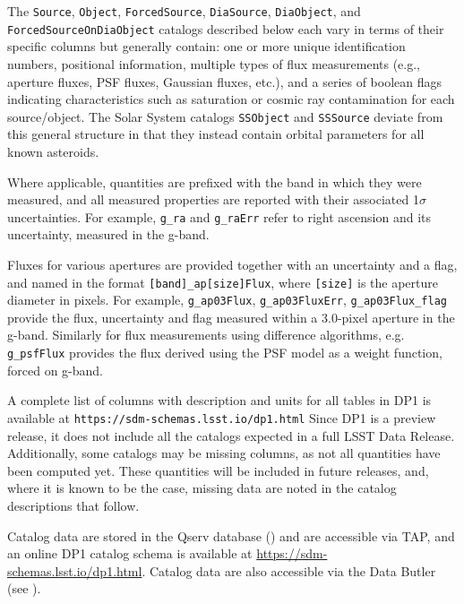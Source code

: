 The \texttt{Source}, \texttt{Object}, \texttt{ForcedSource}, \texttt{DiaSource}, \texttt{DiaObject}, and \texttt{ForcedSourceOnDiaObject} catalogs described below each vary in terms of their specific columns but generally contain: one or more unique identification numbers, positional information, multiple types of \gls{flux} measurements (e.g., aperture fluxes, \gls{PSF} fluxes, Gaussian fluxes, etc.), and a series of boolean flags indicating characteristics such as saturation or cosmic ray contamination for each source/object.
The Solar System catalogs \texttt{SSObject} and \texttt{SSSource} deviate from this general structure in that they instead contain orbital parameters for all known asteroids.

Where applicable, quantities are prefixed with the band in which they were measured, and all measured properties are reported with their associated 1$\sigma$ uncertainties.
For example, \texttt{g\_ra} and \texttt{g\_raErr} refer to right ascension and its uncertainty, measured in the g-band.

Fluxes for various apertures are provided together with an uncertainty and  a flag, and named in the format \texttt{[band]\_ap[size]Flux}, where \texttt{[size]} is the aperture diameter in pixels.
For example, \texttt{g\_ap03Flux}, \texttt{g\_ap03FluxErr}, \texttt{g\_ap03Flux\_flag} provide the flux, uncertainty and flag measured within a 3.0-pixel aperture in the g-band.
Similarly for flux measurements using difference algorithms, e.g. \texttt{g\_psfFlux} provides the flux derived using the PSF model as a weight function, forced on g-band.

A complete list of columns  with description and units for all tables in DP1 is available at \nolinkurl{https://sdm-schemas.lsst.io/dp1.html}
Since \gls{DP1} is a preview release, it does not include all the catalogs expected in a full \gls{LSST} \gls{Data Release}.
Additionally, some catalogs may be missing columns, as not all quantities have been computed yet.
These quantities will be included in future releases, and, where it is known to be the case,  missing data are noted in the catalog descriptions that follow.

Catalog data are stored in the \gls{Qserv} database () and are accessible via \gls{TAP}, and an online \gls{DP1} catalog \gls{schema} is available at \url{https://sdm-schemas.lsst.io/dp1.html}.
Catalog data are also accessible via the Data \gls{Butler} (see ).

